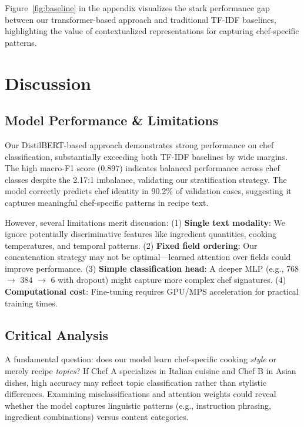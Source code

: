 \documentclass[twocolumn,10pt]{article}
\begin{document}
Figure~\ref{fig:baseline} in the appendix visualizes the stark performance gap between our transformer-based approach and traditional TF-IDF baselines, highlighting the value of contextualized representations for capturing chef-specific patterns.

\section{Discussion}

\subsection{Model Performance \& Limitations}

Our DistilBERT-based approach demonstrates strong performance on chef classification, substantially exceeding both TF-IDF baselines by wide margins. The high macro-F1 score (0.897) indicates balanced performance across chef classes despite the 2.17:1 imbalance, validating our stratification strategy. The model correctly predicts chef identity in 90.2\% of validation cases, suggesting it captures meaningful chef-specific patterns in recipe text.

However, several limitations merit discussion: (1) \textbf{Single text modality}: We ignore potentially discriminative features like ingredient quantities, cooking temperatures, and temporal patterns. (2) \textbf{Fixed field ordering}: Our concatenation strategy may not be optimal—learned attention over fields could improve performance. (3) \textbf{Simple classification head}: A deeper MLP (e.g., 768 $\rightarrow$ 384 $\rightarrow$ 6 with dropout) might capture more complex chef signatures. (4) \textbf{Computational cost}: Fine-tuning requires GPU/MPS acceleration for practical training times.

\subsection{Critical Analysis}

A fundamental question: does our model learn chef-specific cooking \textit{style} or merely recipe \textit{topics}? If Chef A specializes in Italian cuisine and Chef B in Asian dishes, high accuracy may reflect topic classification rather than stylistic differences. Examining misclassifications and attention weights could reveal whether the model captures linguistic patterns (e.g., instruction phrasing, ingredient combinations) versus content categories.
\end{document}
